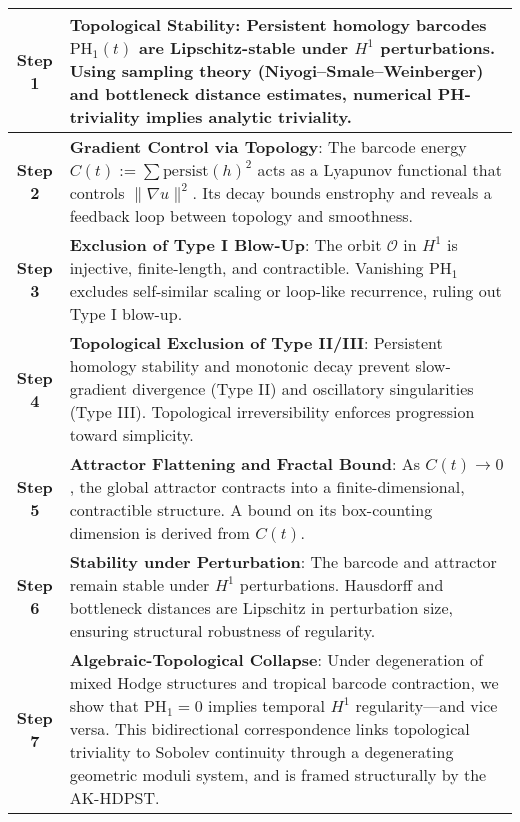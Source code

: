 \documentclass[11pt]{article}
\theoremstyle{definition}
\begin{document}
\begin{center}
\renewcommand{\arraystretch}{1.4}
\begin{tabular}{|c|p{12.5cm}|}
\hline
\textbf{Step 1} & \textbf{Topological Stability}: Persistent homology barcodes $\mathrm{PH}_1(t)$ are Lipschitz-stable under $H^1$ perturbations. Using sampling theory (Niyogi--Smale--Weinberger) and bottleneck distance estimates, numerical PH-triviality implies analytic triviality. \\
\hline
\textbf{Step 2} & \textbf{Gradient Control via Topology}: The barcode energy $C(t) := \sum \mathrm{persist}(h)^2$ acts as a Lyapunov functional that controls $\|\nabla u\|^2$. Its decay bounds enstrophy and reveals a feedback loop between topology and smoothness. \\
\hline
\textbf{Step 3} & \textbf{Exclusion of Type I Blow-Up}: The orbit $\mathcal{O}$ in $H^1$ is injective, finite-length, and contractible. Vanishing $\mathrm{PH}_1$ excludes self-similar scaling or loop-like recurrence, ruling out Type I blow-up. \\
\hline
\textbf{Step 4} & \textbf{Topological Exclusion of Type II/III}: Persistent homology stability and monotonic decay prevent slow-gradient divergence (Type II) and oscillatory singularities (Type III). Topological irreversibility enforces progression toward simplicity. \\
\hline
\textbf{Step 5} & \textbf{Attractor Flattening and Fractal Bound}: As $C(t) \to 0$, the global attractor contracts into a finite-dimensional, contractible structure. A bound on its box-counting dimension is derived from $C(t)$. \\
\hline
\textbf{Step 6} & \textbf{Stability under Perturbation}: The barcode and attractor remain stable under $H^1$ perturbations. Hausdorff and bottleneck distances are Lipschitz in perturbation size, ensuring structural robustness of regularity. \\
\hline
\textbf{Step 7} & \textbf{Algebraic-Topological Collapse}: Under degeneration of mixed Hodge structures and tropical barcode contraction, we show that $\mathrm{PH}_1 = 0$ implies temporal $H^1$ regularity---and vice versa. This bidirectional correspondence links topological triviality to Sobolev continuity through a degenerating geometric moduli system, and is framed structurally by the AK-HDPST.
\\
\hline
\end{tabular}
\end{center}
\end{document}
